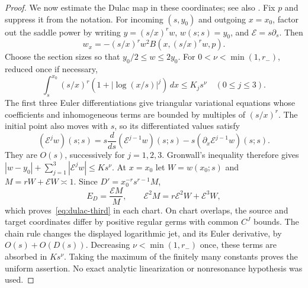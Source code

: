 \begin{proof}
We now estimate the Dulac map in these coordinates; see also
\cite{MarinVilladelprat2020}. Fix $p$ and suppress it from the notation.
For incoming $(s,y_0)$ and outgoing $x=x_0$, factor out the saddle power by
writing $y=(s/x)^rw$, $w(s;s)=y_0$, and
$\mathcal E=s\partial_s$. Then
\[
 w_x=-(s/x)^rw^2B(x,(s/x)^rw,p).
\]
Choose the section sizes so that $y_0/2\le w\le2y_0$.
For $0<\nu<\min(1,r_-)$, reduced once if necessary,
\[
 \int_s^{x_0}(s/x)^r(1+|\log(x/s)|^j)\,dx\le K_js^\nu
 \quad(0\le j\le3).
\]
The first three Euler differentiations give triangular variational
equations whose coefficients and inhomogeneous terms are bounded by
multiples of $(s/x)^r$. The initial point also moves with $s$, so its
differentiated values satisfy
\[
 (\mathcal E^jw)(s;s)
 =s\frac d{ds}(\mathcal E^{j-1}w)(s;s)
                  -s(\partial_x\mathcal E^{j-1}w)(s;s).
\]
They are $O(s)$, successively for $j=1,2,3$. Gronwall's inequality
therefore gives $|w-y_0|+\sum_{j=1}^3|\mathcal E^jw|\le Ks^\nu$.
At $x=x_0$ let $W=w(x_0;s)$ and $M=rW+\mathcal EW\asymp1$.
Since $D'=x_0^{-r}s^{r-1}M$,
\[
 E_D=\frac{\mathcal EM}{M},\qquad
 \mathcal E^2M=r\mathcal E^2W+\mathcal E^3W,
\]
which proves~\eqref{eq:dulac-third} in each chart.  On chart overlaps,
the source and target coordinates differ by positive regular germs with
common $C^J$ bounds.  The chain rule changes the displayed logarithmic
jet, and its Euler derivative, by $O(s)+O(D(s))$.  Decreasing
$\nu<\min(1,r_-)$ once, these terms are absorbed in $Ks^\nu$.  Taking
the maximum of the finitely many constants proves the uniform assertion.
No exact analytic linearization or nonresonance hypothesis was used.
\end{proof}
